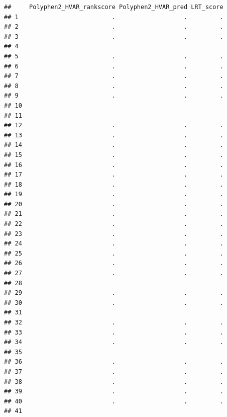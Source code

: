 \documentclass[
]{article}
\begin{document}
\begin{verbatim}
##     Polyphen2_HVAR_rankscore Polyphen2_HVAR_pred LRT_score
## 1                          .                   .         .
## 2                          .                   .         .
## 3                          .                   .         .
## 4                                                         
## 5                          .                   .         .
## 6                          .                   .         .
## 7                          .                   .         .
## 8                          .                   .         .
## 9                          .                   .         .
## 10                                                        
## 11                                                        
## 12                         .                   .         .
## 13                         .                   .         .
## 14                         .                   .         .
## 15                         .                   .         .
## 16                         .                   .         .
## 17                         .                   .         .
## 18                         .                   .         .
## 19                         .                   .         .
## 20                         .                   .         .
## 21                         .                   .         .
## 22                         .                   .         .
## 23                         .                   .         .
## 24                         .                   .         .
## 25                         .                   .         .
## 26                         .                   .         .
## 27                         .                   .         .
## 28                                                        
## 29                         .                   .         .
## 30                         .                   .         .
## 31                                                        
## 32                         .                   .         .
## 33                         .                   .         .
## 34                         .                   .         .
## 35                                                        
## 36                         .                   .         .
## 37                         .                   .         .
## 38                         .                   .         .
## 39                         .                   .         .
## 40                         .                   .         .
## 41                                                        

\end{verbatim}
\end{document}
